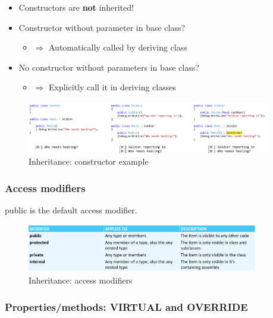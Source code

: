 \documentclass{article}
\newcommand{\bold}[1]{\textbf{#1}}
\begin{document}
\begin{itemize}
    \item Constructors are \bold{not} inherited!
    \item Constructor without parameter in base class?
    \begin{itemize}
        \item $\Rightarrow$ Automatically called by deriving class
    \end{itemize}
    \item No constructor without parameters in base class?
    \begin{itemize}
        \item $\Rightarrow$ Explicitly call it in deriving classes
    \end{itemize}
\end{itemize}

\begin{figure}[H]
    \centering
    \includegraphics[width=0.95\textwidth]{inheritance-constructor.png}
    \caption{Inheritance: constructor example}
\end{figure}

\subsubsection{Access modifiers}

public is the default access modifier.

\begin{figure}[H]
    \centering
    \includegraphics[width=0.9\textwidth]{inheritance-access-modifiers.png}
    \caption{Inheritance: access modifiers}
\end{figure}

\subsubsection{Properties/methods: VIRTUAL and OVERRIDE}
\end{document}
